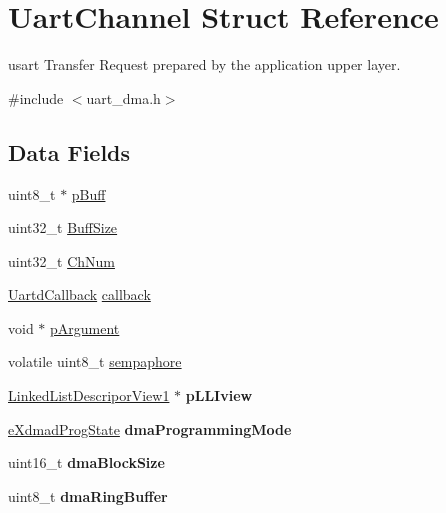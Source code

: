 \hypertarget{structUartChannel}{}\section{Uart\+Channel Struct Reference}
\label{structUartChannel}


usart Transfer Request prepared by the application upper layer.  




{\ttfamily \#include $<$uart\+\_\+dma.\+h$>$}

\subsection*{Data Fields}
\begin{DoxyCompactItemize}
\item 
uint8\+\_\+t $\ast$ \mbox{\hyperlink{structUartChannel_ae40c80620ff724da404a7ee5d889ebaf}{p\+Buff}}
\item 
uint32\+\_\+t \mbox{\hyperlink{structUartChannel_a97dc7f4ec156e8a4620f9ed76462aeec}{Buff\+Size}}
\item 
uint32\+\_\+t \mbox{\hyperlink{structUartChannel_afb54680c49c6d94b9f873b78a63c6481}{Ch\+Num}}
\item 
\mbox{\hyperlink{uart__dma_8h_a31d6530d0dbbe2541129f24aa1fa4e72}{Uartd\+Callback}} \mbox{\hyperlink{structUartChannel_a7a073f156cda41c0b3d3546d7b172c63}{callback}}
\item 
void $\ast$ \mbox{\hyperlink{structUartChannel_a3bfbed91e43b7dd198182be59be7875b}{p\+Argument}}
\item 
volatile uint8\+\_\+t \mbox{\hyperlink{structUartChannel_ac71a5b29d292b5fcb48d5ab0292dff8f}{sempaphore}}
\item 
\mbox{\label{structUartChannel_ae429cd7429ae10bc3213bfd467eff0c0}} 
\mbox{\hyperlink{group__dmad__structs_gad7875bda32a17423528ef3eea98e2be3}{Linked\+List\+Descripor\+View1}} $\ast$ {\bfseries p\+L\+L\+Iview}
\item 
\mbox{\label{structUartChannel_a73cc513000441d0ef2c3ce6bdde5fa01}} 
\mbox{\hyperlink{group__dmad__structs_gae5f8d9cd578ec745f050ebe575bc5753}{e\+Xdmad\+Prog\+State}} {\bfseries dma\+Programming\+Mode}
\item 
\mbox{\label{structUartChannel_a8d8033d3cca6a667318894326187e9a7}} 
uint16\+\_\+t {\bfseries dma\+Block\+Size}
\item 
\mbox{\label{structUartChannel_a60db55459b2eafc91d3c2553c58100c0}} 
uint8\+\_\+t {\bfseries dma\+Ring\+Buffer}
\end{DoxyCompactItemize}



